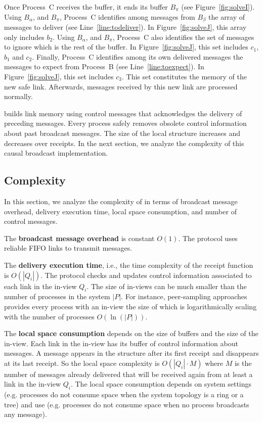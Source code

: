 \noindent Once Process~C receives the buffer, it ends its buffer $B_\pi$ (see
Figure~\ref{fig:solveI}). Using $B_\alpha$, and $B_\pi$, Process~C identifies
among messages from $B_\beta$ the array of messages to deliver (see
Line~\ref{line:todeliver}). In Figure~\ref{fig:solveJ}, this array only includes
$b_2$.  Using $B_\alpha$, and $B_\pi$, Process~C also identifies the set of
messages to ignore which is the rest of the buffer. In Figure~\ref{fig:solveJ},
this set includes $c_1$, $b_1$ and $c_2$. Finally, Process~C identifies among its own
delivered messages the messages to expect from Process~B (see
Line~\ref{line:toexpect}). In Figure~\ref{fig:solveJ}, this set includes $c_3$.
This set constitutes the memory of the new safe link.  Afterwards, messages
received by this new link are processed normally.


\RPCBROADCAST builds link memory using control messages that acknowledges the
delivery of preceding messages. Every process safely removes obsolete control
information about past broadcast messages.  The size of the local structure
increases and decreases over receipts.  In the next section, we analyze the
complexity of this causal broadcast implementation.

\subsection{Complexity}
\label{subsec:complexity}

In this section, we analyze the complexity of \RPCBROADCAST in terms of
broadcast message overhead, delivery execution time, local space consumption,
and number of control messages.

\noindent The \textbf{broadcast message overhead} is constant $O(1)$. The
protocol uses reliable FIFO links to transmit messages.

\noindent The \textbf{delivery execution time}, i.e., the time complexity of the
receipt function is $O(|Q_i|)$.  The protocol checks and updates control
information associated to each link in the in-view $Q_i$. The size of in-views
can be much smaller than the number of processes in the system $|P|$. For
instance, peer-sampling approaches~\cite{ganesh2001scamp,nedelec2017adaptive}
provides every process with an in-view the size of which is logarithmically
scaling with the number of processes $O(\ln(|P|))$.

\noindent The \textbf{local space consumption} depends on the size of buffers
and the size of the in-view. Each link in the in-view has its buffer of control
information about messages. A message appears in the structure after its first
receipt and disappears at its last receipt. So the local space complexity is
$O(|Q_i| \cdot M)$ where $M$ is the number of messages already delivered that
will be received again from at least a link in the in-view $Q_i$. 
The local space consumption depends on system settings (e.g. processes do not
consume space when the system topology is a ring or a tree) and use
(e.g. processes do not consume space when no process broadcasts any message).

